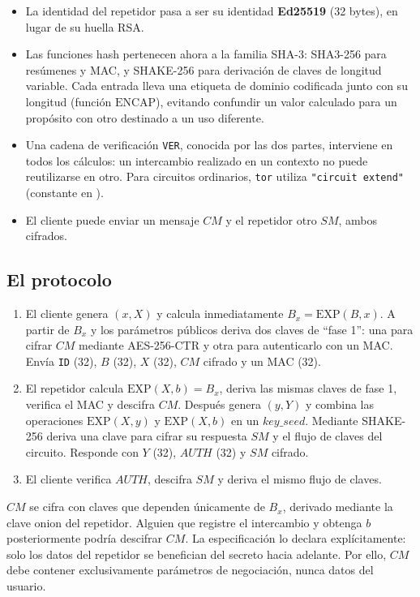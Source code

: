 \begin{itemize}
  \item La identidad del repetidor pasa a ser su identidad \textbf{Ed25519} (32 bytes), en lugar de su huella RSA.
  \item Las funciones hash pertenecen ahora a la familia SHA-3: SHA3-256 para resúmenes y MAC, y SHAKE-256 para derivación de claves de longitud variable. Cada entrada lleva una etiqueta de dominio codificada junto con su longitud (función $\mathrm{ENCAP}$), evitando confundir un valor calculado para un propósito con otro destinado a un uso diferente.
  \item Una cadena de verificación \texttt{VER}, conocida por las dos partes, interviene en todos los cálculos: un intercambio realizado en un contexto no puede reutilizarse en otro. Para circuitos ordinarios, \texttt{tor} utiliza \texttt{"circuit extend"} (constante  en ).
  \item El cliente puede enviar un mensaje $CM$ y el repetidor otro $SM$, ambos cifrados.
\end{itemize}

\subsection{El protocolo}

\begin{enumerate}
  \item El cliente genera $(x,X)$ y calcula inmediatamente $B_x = \mathrm{EXP}(B,x)$. A partir de $B_x$ y los parámetros públicos deriva dos claves de \enquote{fase 1}: una para cifrar $CM$ mediante AES-256-CTR y otra para autenticarlo con un MAC. Envía \texttt{ID} (32), $B$ (32), $X$ (32), $CM$ cifrado y un MAC (32).
  \item El repetidor calcula $\mathrm{EXP}(X,b) = B_x$, deriva las mismas claves de fase 1, verifica el MAC y descifra $CM$. Después genera $(y,Y)$ y combina las operaciones $\mathrm{EXP}(X,y)$ y $\mathrm{EXP}(X,b)$ en un $\mathit{key\_seed}$. Mediante SHAKE-256 deriva una clave para cifrar su respuesta $SM$ y el flujo de claves del circuito. Responde con $Y$ (32), $\mathit{AUTH}$ (32) y $SM$ cifrado.
  \item El cliente verifica $\mathit{AUTH}$, descifra $SM$ y deriva el mismo flujo de claves.
\end{enumerate}

\begin{attenzione}
$CM$ se cifra con claves que dependen únicamente de $B_x$, derivado mediante la clave onion del repetidor. Alguien que registre el intercambio y obtenga $b$ posteriormente podría descifrar $CM$. La especificación lo declara explícitamente: solo los datos del repetidor se benefician del secreto hacia adelante. Por ello, $CM$ debe contener exclusivamente parámetros de negociación, nunca datos del usuario.
\end{attenzione}

